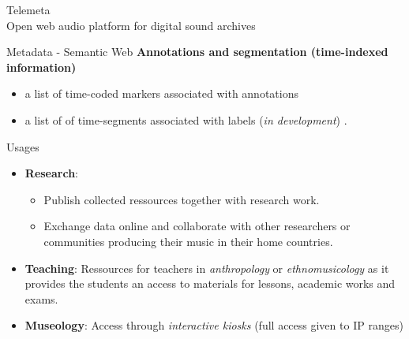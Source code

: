 \documentclass[final, hyperref, table]{beamer}
\begin{document}
\begin{frame}[containsverbatim]{}
\begin{columns}[T]
\begin{column}[T]{.5\linewidth}
\begin{block}{{\Large Telemeta}\\Open web audio platform for
          digital sound archives}
\begin{center}
\begin{minipage}[h]{0.97\linewidth}
\begin{block}{Metadata - Semantic Web}
            \textbf{Annotations and segmentation (time-indexed information)}
            \begin{itemize}
            \item a list of \alert{time-coded markers} associated with
              annotations
            \item a list of of \alert{time-segments} associated with
              labels (\emph{in development}) .
            \end{itemize}
          \end{block}
        \end{minipage}
    \end{center}
      \end{block}

      \begin{block}{Usages}
        \vspace{-0.5cm}
              \begin{itemize}
              \item \textbf{Research}:
                \begin{itemize}\footnotesize
                \item \alert{Publish} collected ressources together with research
                  work.
                \item \alert{Exchange} data online and \alert{collaborate} with other researchers or
                  communities producing their music in their home countries.
                \end{itemize}
              \item \textbf{Teaching}: Ressources for teachers in \emph{anthropology} or
                \emph{ethnomusicology} as it provides the students an access to
                materials for lessons, academic works and exams.
              \item \textbf{Museology}: Access through \emph{interactive kiosks} (full access given to IP ranges)
              \end{itemize}
       
    \end{block}


\end{column}
\end{columns}
\end{frame}
\end{document}
